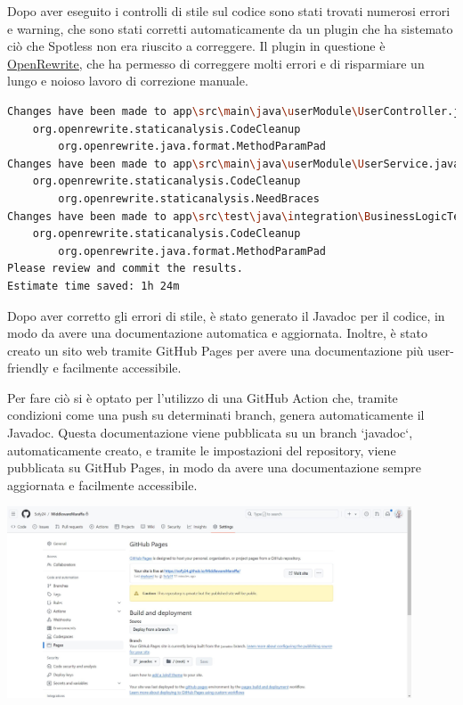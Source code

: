 Dopo aver eseguito i controlli di stile sul codice sono stati trovati numerosi errori e warning, che sono stati corretti automaticamente da un plugin che ha sistemato ciò che Spotless non era riuscito a correggere. Il plugin in questione è \href{https://github.com/openrewrite/rewrite}{\underline{OpenRewrite}}, che ha permesso di correggere molti errori e di risparmiare un lungo e noioso lavoro di correzione manuale.

\begin{lstlisting}[language=Bash, caption={Output di OpenRewrite}, label=list:openrewrite]
Changes have been made to app\src\main\java\userModule\UserController.java by:
    org.openrewrite.staticanalysis.CodeCleanup
        org.openrewrite.java.format.MethodParamPad
Changes have been made to app\src\main\java\userModule\UserService.java by:
    org.openrewrite.staticanalysis.CodeCleanup
        org.openrewrite.staticanalysis.NeedBraces
Changes have been made to app\src\test\java\integration\BusinessLogicTestIntegration.java by:
    org.openrewrite.staticanalysis.CodeCleanup
        org.openrewrite.java.format.MethodParamPad
Please review and commit the results.
Estimate time saved: 1h 24m 
\end{lstlisting}

Dopo aver corretto gli errori di stile, è stato generato il Javadoc per il codice, in modo da avere una documentazione automatica e aggiornata. Inoltre, è stato creato un sito web tramite GitHub Pages per avere una documentazione più user-friendly e facilmente accessibile. 

Per fare ciò si è optato per l'utilizzo di una GitHub Action che, tramite condizioni come una push su determinati branch, genera automaticamente il Javadoc. Questa documentazione viene pubblicata su un branch `javadoc`, automaticamente creato, e tramite le impostazioni del repository, viene pubblicata su GitHub Pages, in modo da avere una documentazione sempre aggiornata e facilmente accessibile.

\includegraphics[width=12cm]{report/img/github_javadoc.jpg}\\[1.5cm]

